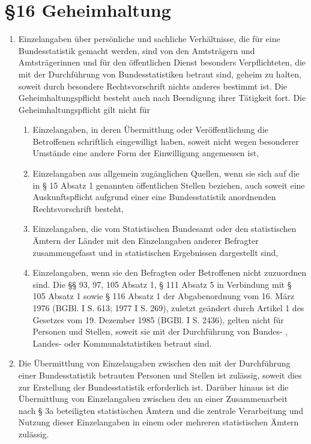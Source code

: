 \documentclass[A4, 12pt]{scrbook}
\begin{document}
    \section{\S 16 Geheimhaltung}
        \begin{enumerate}[label=(\arabic*)]
            \item Einzelangaben über persönliche und sachliche Verhältnisse, die für eine Bundesstatistik gemacht werden, sind von den Amtsträgern und Amtsträgerinnen und für den öffentlichen Dienst besonders Verpflichteten, die mit der Durchführung von Bundesstatistiken betraut sind, geheim zu halten, soweit durch besondere Rechtsvorschrift nichts anderes bestimmt ist. Die Geheimhaltungspflicht besteht auch nach Beendigung ihrer Tätigkeit fort. Die Geheimhaltungspflicht gilt nicht für
                \begin{enumerate}[label=\arabic*.]
                    \item Einzelangaben, in deren Übermittlung oder Veröffentlichung die Betroffenen schriftlich eingewilligt haben, soweit nicht wegen besonderer Umstände eine andere Form der Einwilligung angemessen ist,
                    \item Einzelangaben aus allgemein zugänglichen Quellen, wenn sie sich auf die in § 15 Absatz 1 genannten öffentlichen Stellen beziehen, auch soweit eine Auskunftspflicht aufgrund einer eine Bundesstatistik anordnenden Rechtsvorschrift besteht,
                    \item Einzelangaben, die vom Statistischen Bundesamt oder den statistischen Ämtern der Länder mit den Einzelangaben anderer Befragter zusammengefasst und in statistischen Ergebnissen dargestellt sind, 
                    \item Einzelangaben, wenn sie den Befragten oder Betroffenen nicht zuzuordnen sind. Die §§ 93, 97, 105 Absatz 1, § 111 Absatz 5 in Verbindung mit § 105 Absatz 1 sowie § 116 Absatz 1 der Abgabenordnung vom 16. März 1976 (BGBl. I S. 613; 1977 I S. 269), zuletzt geändert durch Artikel 1 des Gesetzes vom 19. Dezember 1985 (BGBl. I S. 2436), gelten nicht für Personen und Stellen, soweit sie mit der Durchführung von Bundes- , Landes- oder Kommunalstatistiken betraut sind.
                \end{enumerate}
            \item Die Übermittlung von Einzelangaben zwischen den mit der Durchführung einer Bundesstatistik betrauten Personen und Stellen ist zulässig, soweit dies zur Erstellung der Bundesstatistik erforderlich ist. Darüber hinaus ist die Übermittlung von Einzelangaben zwischen den an einer Zusammenarbeit nach § 3a beteiligten statistischen Ämtern und die zentrale Verarbeitung und Nutzung dieser Einzelangaben in einem oder mehreren statistischen Ämtern zulässig.

\end{enumerate}
\end{document}
